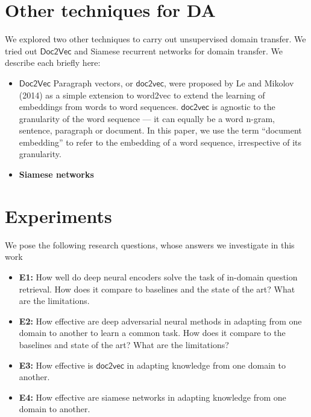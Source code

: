 \documentclass{sigkddExp}
\begin{document}
\section{Other techniques for DA}
\label{other_techniques}
We explored two other techniques to carry out unsupervised domain transfer. We tried out $\textsf{Doc2Vec}$ \cite{doc2vec1} and Siamese recurrent networks \cite{siamese} for domain transfer. We describe each briefly here:

\begin{itemize}[topsep=0pt,itemsep=-1ex,partopsep=1ex,parsep=1ex]
\item $\mathbf{\mathsf{Doc2Vec}}$ Paragraph vectors, or $\mathsf{doc2vec}$, were proposed by Le and Mikolov (2014) as a simple extension to word2vec to extend the learning of embeddings from words to word sequences. $\mathsf{doc2vec}$ is agnostic to the  granularity of the word sequence — it can equally be a word n-gram, sentence, paragraph or document. In this paper, we use the term ``document embedding'' to refer to the embedding of a word sequence, irrespective of its granularity.

\item \textbf{Siamese networks} 

\end{itemize}

\section{Experiments}
\label{experiments}
We pose the following research questions, whose answers we investigate in this work
\begin{itemize}[topsep=0pt,itemsep=-1ex,partopsep=1ex,parsep=1ex]
\item \textbf{E1:} How well do deep neural encoders solve the task of in-domain question retrieval. How does it compare to baselines and the state of the art? What are the limitations.
\item \textbf{E2:} How effective are deep adversarial neural methods in adapting from one domain to another to learn a common task. How does it compare to the baselines and state of the art? What are the limitations?
\item \textbf{E3:} How effective is $\mathsf{doc2vec}$ in adapting knowledge from one domain to another.
\item \textbf{E4:} How effective are siamese networks in adapting knowledge from one domain to another.
\end{itemize}
\end{document}

